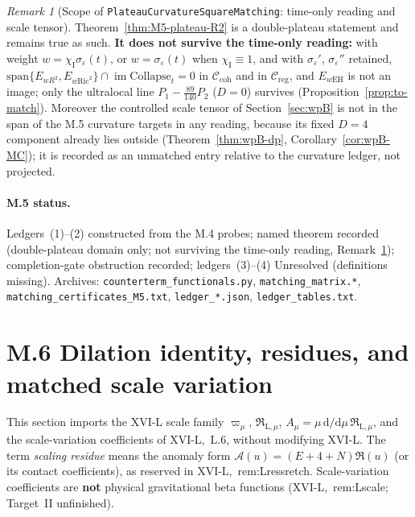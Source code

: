 \documentclass{article}
\theoremstyle{remark}
\newtheorem{remark}[proposition]{Remark}
\newcommand{\sigeps}{\sigma_\varepsilon}
\newcommand{\chiI}{\chi_{\mathrm I}}
\newcommand{\Ccoh}{\mathcal C_{\mathrm{coh}}}
\newcommand{\Creg}{\mathcal C_{\mathrm{reg}}}
\newcommand{\Coll}{\mathrm{Collapse}}
\begin{document}
\begin{remark}[Scope of \texttt{PlateauCurvatureSquareMatching}: time-only reading and scale tensor]
\label{rem:M5-timeonly}
Theorem~\ref{thm:M5-plateau-R2} is a double-plateau statement and remains true as such.
\textbf{It does not survive the time-only reading:} with weight $w=\chiI\sigeps(t)$, or $w=\sigeps(t)$ when $\chiI\equiv1$, and with $\sigeps'$, $\sigeps''$ retained, $\mathrm{span}\{E_{wR^2},E_{w\mathrm{Ric}^2}\}\cap\operatorname{im}\Coll_t=0$ in $\Ccoh$ and in $\Creg$, and $E_{w\mathrm{EH}}$ is not an image; only the ultralocal line $P_1-\tfrac{89}{140}P_2$ ($D=0$) survives (Proposition~\ref{prop:to-match}).
Moreover the controlled scale tensor of Section~\ref{sec:wpB} is not in the span of the M.5 curvature targets in any reading, because its fixed $D=4$ component already lies outside (Theorem~\ref{thm:wpB-dp}, Corollary~\ref{cor:wpB-MC}); it is recorded as an unmatched entry relative to the curvature ledger, not projected.
\end{remark}

\paragraph{M.5 status.}
Ledgers~(1)--(2) constructed from the M.4 probes; named theorem recorded (double-plateau domain only; not surviving the time-only reading, Remark~\ref{rem:M5-timeonly}); completion-gate obstruction recorded; ledgers~(3)--(4) Unresolved (definitions missing).
Archives: \texttt{counterterm\_functionals.py}, \texttt{matching\_matrix.*}, \texttt{matching\_certificates\_M5.txt}, \texttt{ledger\_*.json}, \texttt{ledger\_tables.txt}.


\section{M.6 Dilation identity, residues, and matched scale variation}
\label{sec:m6}

This section imports the XVI-L scale family $\varpi_\mu$, $\mathfrak R_{\mathrm L,\mu}$, $A_\mu=\mu\,\mathrm d/\mathrm d\mu\,\mathfrak R_{\mathrm L,\mu}$, and the scale-variation coefficients of XVI-L,~L.6, without modifying XVI-L.
The term \emph{scaling residue} means the anomaly form $\mathcal A(u)=(E+4+N)\mathfrak R(u)$ (or its contact coefficients), as reserved in XVI-L,~rem:Lressretch.
Scale-variation coefficients are \textbf{not} physical gravitational beta functions (XVI-L,~rem:Lscale; Target~II unfinished).
\end{document}
